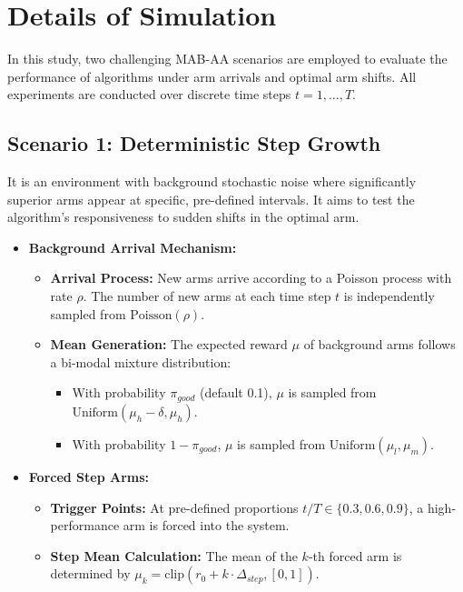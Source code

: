 \documentclass[
  12pt]{article}
\begin{document}
\section{Details of Simulation}


In this study, two challenging MAB-AA scenarios are employed to evaluate the performance of algorithms under arm arrivals and optimal arm shifts. All experiments are conducted over discrete time steps $t = 1, \dots, T$.

\subsection{Scenario 1: Deterministic Step Growth}
It is an environment with background stochastic noise where significantly superior arms appear at specific, pre-defined intervals. It aims to test the algorithm's responsiveness to sudden shifts in the optimal arm.

\begin{itemize}
    \item \textbf{Background Arrival Mechanism:} 
    \begin{itemize}
        \item \textbf{Arrival Process:} New arms arrive according to a Poisson process with rate $\rho$. The number of new arms at each time step $t$ is independently sampled from $\text{Poisson}(\rho)$.
        \item \textbf{Mean Generation:} The expected reward $\mu$ of background arms follows a bi-modal mixture distribution:
        \begin{itemize}
            \item With probability $\pi_{good}$ (default 0.1), $\mu$ is sampled from $\text{Uniform}(\mu_h - \delta, \mu_h)$.
            \item With probability $1 - \pi_{good}$, $\mu$ is sampled from $\text{Uniform}(\mu_l, \mu_m)$.

        \end{itemize}
    \end{itemize}
    \item \textbf{Forced Step Arms:} 
    \begin{itemize}
        \item \textbf{Trigger Points:} At pre-defined proportions $t/T \in \{0.3, 0.6, 0.9\}$, a high-performance arm is forced into the system.
        \item \textbf{Step Mean Calculation:} The mean of the $k$-th forced arm is determined by $\mu_k = \text{clip}(r_0 + k \cdot \Delta_{step}, [0, 1])$.
    
    \end{itemize}
\end{itemize}
\end{document}
